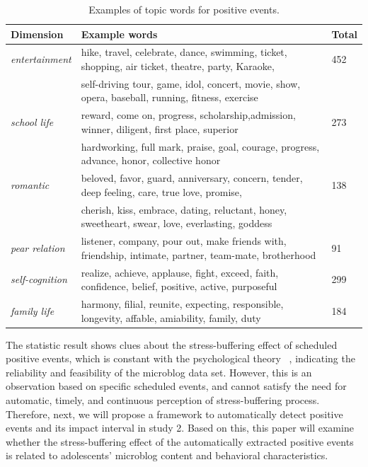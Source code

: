 \begin{table}
\centering
\caption{\small{Examples of topic words for positive events.}}
\label{tab:keyWords}
\small{
\begin{tabular}{lll}
\toprule
Dimension & Example words & Total \\ \midrule
\emph{entertainment}  & hike, travel, celebrate, dance, swimming, ticket, shopping, air ticket, theatre, party, Karaoke,& 452\\
                      & self-driving tour, game, idol, concert, movie, show, opera, baseball, running, fitness, exercise & \\
\emph{school life}    & reward, come on, progress, scholarship,admission, winner, diligent, first place, superior & 273\\
				      & hardworking, full mark,  praise, goal, courage, progress, advance, honor, collective honor& \\
\emph{romantic}       &  beloved, favor, guard, anniversary,  concern, tender, deep feeling, care, true love, promise, & 138\\
				      & cherish, kiss, embrace, dating, reluctant, honey, sweetheart, swear, love, everlasting, goddess &\\
\emph{pear relation}  & listener, company, pour out, make friends with, friendship, intimate, partner, team-mate, brotherhood& 91\\
\emph{self-cognition} & realize, achieve, applause, fight, exceed, faith, confidence, belief, positive, active, purposeful & 299\\
\emph{family life}    & harmony, filial, reunite, expecting, responsible, longevity, affable, amiability, family, duty & 184\\
\bottomrule
\end{tabular}}
\end{table}


The statistic result shows clues about the stress-buffering effect of scheduled positive events,
which is constant with the psychological theory ~\citep{Cohen1984Positive, Cohen2010Positive, Needles1990Positive},
indicating the reliability and feasibility of the microblog data set.
However,
this is an observation based on specific scheduled events,
and cannot satisfy the need for automatic, timely, and continuous perception of stress-buffering process.
Therefore, next, we will propose a framework to automatically detect positive events and its impact interval in study 2.
Based on this, this paper will examine whether the stress-buffering effect of the automatically extracted positive events
is related to adolescents' microblog content and behavioral characteristics.

